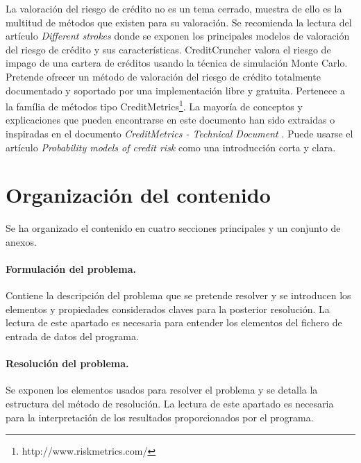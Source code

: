 La valoraci\'on del riesgo de cr\'edito no es un tema cerrado, muestra de ello 
es la multitud de m\'etodos que existen para su valoraci\'on. Se recomienda la 
lectura del art\'iculo \emph{Different strokes} \cite{Risk:Dif_Str} donde se 
exponen los principales modelos de valoraci\'on del riesgo de cr\'edito y sus 
caracter\'isticas. 
\newline
\newline
CreditCruncher valora el riesgo de impago de una cartera de cr\'editos usando la 
t\'ecnica de simulaci\'on Monte Carlo. Pretende ofrecer un m\'etodo de valoraci\'on 
del riesgo de cr\'edito totalmente documentado y soportado por una implementaci\'on 
libre y gratuita. Pertenece a la fam\'ilia de m\'etodos tipo 
CreditMetrics\footnote{http://www.riskmetrics.com/}.
\newline
\newline
La mayor\'ia de conceptos y explicaciones que pueden 
encontrarse en este documento han sido extraidas o inspiradas en el documento 
\emph{CreditMetrics - Technical Document} \cite{CreditMetrics:Tech_Doc}.
Puede usarse el art\'iculo \emph{Probability models of credit risk} \cite{cbs:glasser} 
como una introducci\'on corta y clara.


\section{Organizaci\'on del contenido}

Se ha organizado el contenido en cuatro secciones principales y un conjunto de 
anexos.

\paragraph{Formulaci\'on del problema.} Contiene la descripci\'on del problema
que se pretende resolver y se introducen los elementos y propiedades considerados 
claves para la posterior resoluci\'on. La lectura de este apartado es necesaria para
entender los elementos del fichero de entrada de datos del programa.

\paragraph{Resoluci\'on del problema.} Se exponen los elementos usados para 
resolver el problema y se detalla la estructura del m\'etodo de resoluci\'on.
La lectura de este apartado es necesaria para la interpretaci\'on de los 
resultados proporcionados por el programa.


